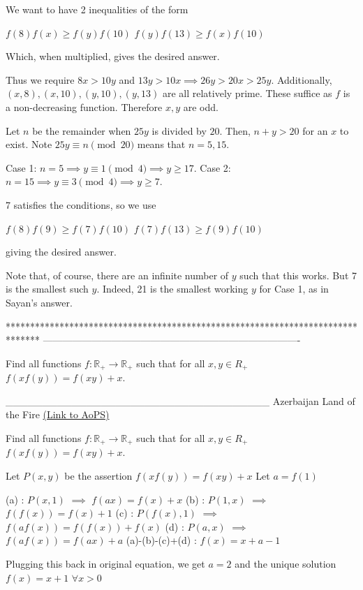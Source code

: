 \begin{solution}
	We want to have 2 inequalities of the form 

$f(8)f(x) \geq f(y)f(10)$
$f(y)f(13) \geq f(x)f(10)$

Which, when multiplied, gives the desired answer. 

Thus we require $8x>10y$ and $13y>10x \implies 26y>20x>25y$. Additionally, $(x,8), (x,10), (y,10), (y,13)$ are all relatively prime. These suffice as $f$ is a non-decreasing function. Therefore $x, y$ are odd. 

Let $n$ be the remainder when $25y$ is divided by $20$. Then, $n+y>20$ for an $x$ to exist. Note $25y \equiv n \pmod {20}$ means that $n=5,15$.

Case 1: $n=5 \implies y \equiv 1 \pmod 4 \implies y \geq 17$.
Case 2: $n=15 \implies y \equiv 3 \pmod 4 \implies y \geq 7$. 

7 satisfies the conditions, so we use

$f(8)f(9) \geq f(7)f(10)$
$f(7)f(13) \geq f(9)f(10)$

giving the desired answer.

Note that, of course, there are an infinite number of $y$ such that this works. But 7 is the smallest such $y$. Indeed, 21 is the smallest working $y$ for Case 1, as in Sayan's answer.
\end{solution}
*******************************************************************************
-------------------------------------------------------------------------------

\begin{problem}
	Find all functions $f: \mathbb{R_+}\to\mathbb{R_+}$ such that for all $x,y{\in}R_+$   $f(xf(y))=f(xy)+x$.


____________________________________
Azerbaijan Land of the Fire 
	\flushright \href{https://artofproblemsolving.com/community/c6h530776}{(Link to AoPS)}
\end{problem}



\begin{solution}
	\begin{tcolorbox}Find all functions $f: \mathbb{R_+}\to\mathbb{R_+}$ such that for all $x,y{\in}R_+$   $f(xf(y))=f(xy)+x$.\end{tcolorbox}
Let $P(x,y)$ be the assertion $f(xf(y))=f(xy)+x$
Let $a=f(1)$

(a) : $P(x,1)$ $\implies$ $f(ax)=f(x)+x$
(b) : $P(1,x)$ $\implies$ $f(f(x))=f(x)+1$
(c) : $P(f(x),1)$ $\implies$ $f(af(x))=f(f(x))+f(x)$
(d) : $P(a,x)$ $\implies$ $f(af(x))=f(ax)+a$
(a)-(b)-(c)+(d) : $f(x)=x+a-1$

Plugging this back in original equation, we get $a=2$ and the unique solution $\boxed{f(x)=x+1}$ $\forall x>0$
\end{solution}



